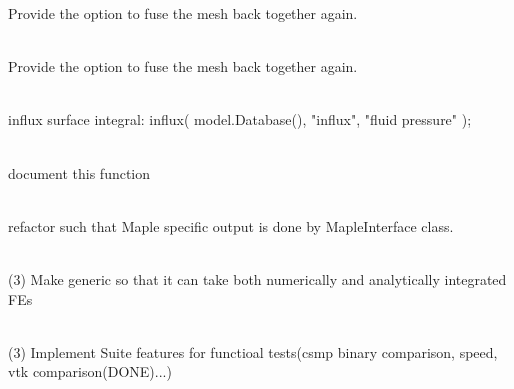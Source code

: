 \begin{DoxyRefList}
\label{todo__todo000187}%
%
Provide the option to fuse the mesh back together again.  
\item[Member \doxylink{classcsmp_1_1_split_boundary_interface_a2cc52158fc2fe9373902219e62fb925b}{csmp\+::Split\+Boundary\+Interface\texorpdfstring{$<$}{<} dim, SPLITBOUNDARY\+\_\+\+COMPLEX \texorpdfstring{$>$}{>}\+::Remove\+Split\+Boundary} (\doxylink{classcsmp_1_1_split_boundary}{csmp\+::\+Split\+Boundary$<$ dim $>$} \&, bool erase\+\_\+interfaces)]\hfill \\
\label{todo__todo000188}%
%
Provide the option to fuse the mesh back together again.  
\item[Member \doxylink{classcsmp_1_1_split_boundary_pressure_diffusion___test_a736b1a0989ee5384c163e93a18433fcb}{csmp\+::Split\+Boundary\+Pressure\+Diffusion\+\_\+\+Test\+::run} ()]\hfill \\
\label{todo__todo000241}%
%
influx surface integral\+:  influx( model.\+Database(), "{}influx"{}, "{}fluid pressure"{} );  
\item[Member \doxylink{namespacecsmp_a942fbdf08c550557b2795bc40eb74cc9}{csmp\+::split\+String} (string str, char delimiter)]\hfill \\
\label{todo__todo000237}%
%
document this function  
\item[Class \doxylink{classcsmp_1_1_statistical_analyzer}{csmp\+::Statistical\+Analyzer\texorpdfstring{$<$}{<} dim \texorpdfstring{$>$}{>}} ]\hfill \\
\label{todo__todo000043}%
%
refactor such that Maple specific output is done by Maple\+Interface class. 
\item[Class \doxylink{classcsmp_1_1_steady_state_diffusor}{csmp\+::Steady\+State\+Diffusor\texorpdfstring{$<$}{<} dim, CELLTYPE \texorpdfstring{$>$}{>}} ]\hfill \\
\label{todo__todo000035}%
%
(3) Make generic so that it can take both numerically and analytically integrated FEs  
\item[Class \doxylink{classcsmp_1_1_t_d_d_unit_test___example}{csmp\+::TDDUnit\+Test\+\_\+\+Example} ]\hfill \\
\label{todo__todo000052}%
%
(3) Implement Suite features for functioal tests(csmp binary comparison, speed, vtk comparison(\+DONE)...)  

\end{DoxyRefList}
